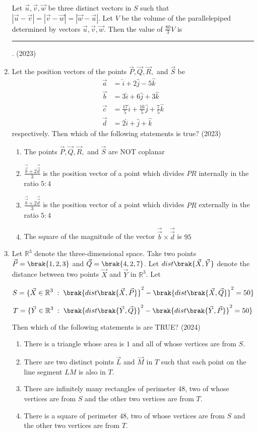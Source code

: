 \begin{enumerate}[label=\thesubsection.\arabic*.,ref=\thesubsection.\theenumi]
Let $\vec{u}, \vec{v}, \vec{w}$ be three distinct vectors in $S$ such that $|\vec{u} - \vec{v}| = |\vec{v} - \vec{w}| = |\vec{w} - \vec{u}|$. Let $V$ be the volume of the parallelepiped determined by vectors $\vec{u}, \vec{v}, \vec{w}$. Then the value of $\frac{80}{3} V$ is
\rule{1cm}{0.1pt}.
\hfill (2023)
\item Let the position vectors of the points $\vec{P}, \vec{Q}, \vec{R},$ and $\vec{S}$ be
\begin{align*}
{\overrightarrow{a}} &= \hat{i} + 2\hat{j} - 5\hat{k}\\ {\overrightarrow{b}} &= 3\hat{i} + 6\hat{j} + 3\hat{k}\\ {\overrightarrow{c}} &= \frac{17}{5}\hat{i} + \frac{16}{5}\hat{j} + \frac{7}{5}\hat{k}\\ {\overrightarrow{d}} &= 2\hat{i} + \hat{j} + \hat{k}
\end{align*}
	respectively. Then which of the following statements is true?
\hfill (2023)
\begin{enumerate}
\item The points $\vec{P}, \vec{Q}, \vec{R},$ and $\vec{S}$ are NOT coplanar
\item $\frac{\vec{\overrightarrow{b}} + 2\vec{\overrightarrow{d}}}{3}$ is the position vector of a point which divides $PR$ internally in the ratio $5:4$
\item $\frac{\vec{\overrightarrow{b}} + 2\vec{\overrightarrow{d}}}{3}$ is the position vector of a point which divides $PR$ externally in the ratio $5:4$
\item The square of the magnitude of the vector $\vec{\overrightarrow{b}} \times \vec{\overrightarrow{d}}$ is $95$
\end{enumerate}
%
\item Let $\mathbb{R}^3$ denote the three-dimensional space. Take two points $\vec{P} = \brak{1,2,3}$ and $\vec{Q} = \brak{4,2,7}$. Let $dist\brak{\vec{X},\vec{Y}}$ denote the distance between two points $\vec{X}$ and $\vec{Y}$ in $\mathbb{R}^3$. Let  

\[
S = \{ \vec{X} \in \mathbb{R}^3 \; : \; \brak{dist\brak{\vec{X},\vec{P}}}^2 - \brak{dist\brak{\vec{X},\vec{Q}}}^2 = 50 \}
\]

\[
T = \{ \vec{Y} \in \mathbb{R}^3 \; : \; \brak{dist\brak{\vec{Y},\vec{Q}}}^2 - \brak{dist\brak{\vec{Y},\vec{P}}}^2 = 50 \}
\]

Then which of the following statements is {are} TRUE?
\hfill (2024)
\begin{enumerate}
\item There is a triangle whose area is $1$ and all of whose vertices are from $S$.
\item There are two distinct points $\vec{L}$ and $\vec{M}$ in $T$ such that each point on the line segment $LM$ is also in $T$.
\item There are infinitely many rectangles of perimeter $48$, two of whose vertices are from $S$ and the other two vertices are from $T$.
\item There is a square of perimeter $48$, two of whose vertices are from $S$ and the other two vertices are from $T$.
\end{enumerate}
\end{enumerate}
